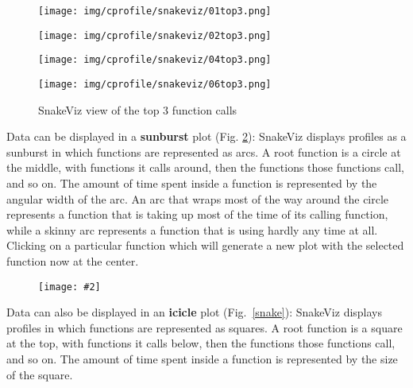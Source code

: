\documentclass[a4paper,pagesize,12pt]{scrbook}
\newcommand{\cscsfigure}[4]{
\begin{figure}
\centering
\texttt{[image: \#2]}
\captionof{figure}{#3}
\label{#4}
\end{figure}
}
\begin{document}
\begin{figure}[ht]
\centering
\caption{SnakeViz view of the top 3 function calls}
\label{snaketop3}
\begin{minipage}[c]{\textwidth}
\captionsetup{labelformat=empty} \centering
    \texttt{[image: img/cprofile/snakeviz/01top3.png]}
\end{minipage}
\noindent
\begin{minipage}[c]{\textwidth}
\captionsetup{labelformat=empty} \centering
    \texttt{[image: img/cprofile/snakeviz/02top3.png]}
\end{minipage}
\noindent
\begin{minipage}[c]{\textwidth}
\captionsetup{labelformat=empty} \centering
    \texttt{[image: img/cprofile/snakeviz/04top3.png]}
\end{minipage}
\noindent
\begin{minipage}[c]{\textwidth}
\captionsetup{labelformat=empty} \centering
    \texttt{[image: img/cprofile/snakeviz/06top3.png]}
\end{minipage}
\end{figure}

Data can be displayed in a \textbf{sunburst} plot (Fig. \ref{snake6cnsunburst}):
SnakeViz displays profiles as a sunburst in which functions are represented as
arcs. A root function is a circle at the middle, with functions it calls
around, then the functions those functions call, and so on. The amount of time
spent inside a function is represented by the angular width of the arc. An arc
that wraps most of the way around the circle represents a function that is
taking up most of the time of its calling function, while a skinny arc
represents a function that is using hardly any time at all.
Clicking on a particular function which will generate a new plot with the
selected function now at the center.

\cscsfigure{0.7}{img/cprofile/snakeviz/06sunburst.png}
{SnakeViz sunburst view}{snake6cnsunburst}

Data can also be displayed in an \textbf{icicle} plot (Fig.~\ref{snake}):
SnakeViz displays profiles in which functions are represented as
squares. A root function is a square at the top, with functions it calls
below, then the functions those functions call, and so on. The amount of time
spent inside a function is represented by the size of the square.
\end{document}

